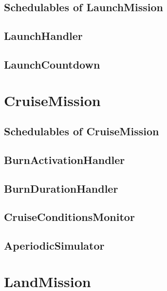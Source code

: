 \documentclass[10pt,a4paper,final]{article}
\begin{document}
\subsection{Schedulables of LaunchMission}

\subsection{LaunchHandler}

\newpage

\subsection{LaunchCountdown}

\newpage

\section{CruiseMission}

\newpage

\subsection{Schedulables of CruiseMission}

\subsection{BurnActivationHandler}

\newpage

\subsection{BurnDurationHandler}

\newpage

\subsection{CruiseConditionsMonitor}

\newpage

\subsection{AperiodicSimulator}

\newpage

\section{LandMission}

\newpage
\end{document}

